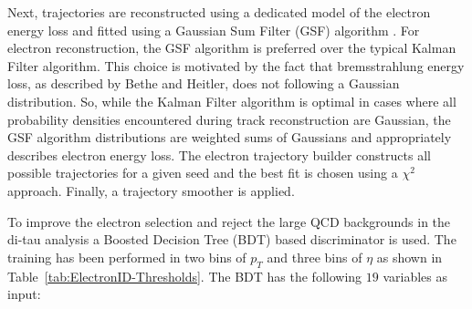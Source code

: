 Next, trajectories are reconstructed using a dedicated
model of the electron energy loss and fitted using a Gaussian Sum Filter (GSF) algorithm \cite{GSF}. 
For electron reconstruction,
the GSF algorithm is preferred over the typical Kalman Filter algorithm.
This choice is motivated by the fact that bremsstrahlung energy loss, 
as described by Bethe and Heitler, 
does not following a Gaussian distribution. 
So, while the Kalman Filter algorithm is optimal in cases where all probability
densities encountered during track reconstruction are Gaussian,
the GSF algorithm distributions are weighted sums of Gaussians and
appropriately describes electron energy loss.
The electron trajectory builder constructs all possible trajectories
for a given seed and the best fit is chosen using a $\chi^{2}$ approach.
Finally, a trajectory smoother is applied.

To improve the electron selection and reject the large QCD backgrounds in the di-tau analysis a 
Boosted Decision Tree (BDT) based %
discriminator is used. The training has been performed in two
bins of $p_{T}$ and three bins of $\eta$ as shown in Table~\ref{tab:ElectronID-Thresholds}\@.
The BDT has the following $19$ variables as input:


